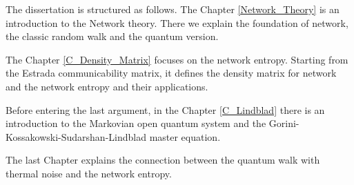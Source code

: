 The dissertation is structured as follows.
The Chapter \ref{Network_Theory} is an introduction to the Network theory. There we explain the foundation of network, the classic random walk and the quantum version.

The Chapter \ref{C_Density_Matrix} focuses on the network entropy. Starting from the Estrada communicability matrix, it defines the density matrix for network and the network entropy and their applications.

Before entering the last argument, in the Chapter \ref{C_Lindblad} there is an introduction to the Markovian open quantum system and the Gorini-Kossakowski-Sudarshan-Lindblad master equation. 

The last Chapter explains the connection between the quantum walk with thermal noise and the network entropy.